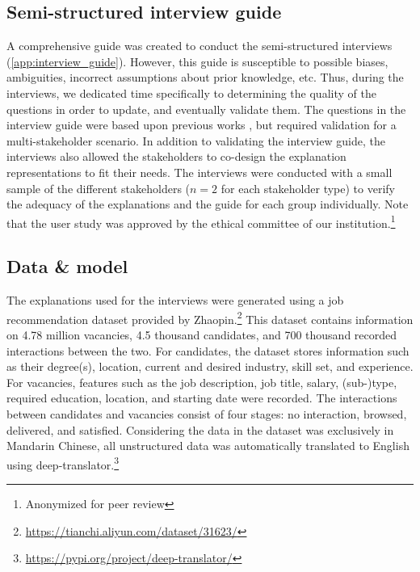 \subsection{Semi-structured interview guide}
A comprehensive guide was created to conduct the semi-structured interviews (\cref{app:interview_guide}). However, this guide is susceptible to possible biases, ambiguities, incorrect assumptions about prior knowledge, etc. Thus, during the interviews, we dedicated time specifically to determining the quality of the questions in order to update, and eventually validate them. The questions in the interview guide were based upon previous works \cite{chen2005trust,cramer2008effects,kleinerman2018providing,pu2011user}, but required validation for a multi-stakeholder scenario. In addition to validating the interview guide, the interviews also allowed the stakeholders to co-design the explanation representations to fit their needs. The interviews were conducted with a small sample of the different stakeholders ($n = 2$ for each stakeholder type) to verify the adequacy of the explanations and the guide for each group individually. Note that the user study was approved by the ethical committee of our institution.\footnote{Anonymized for peer review}


\subsection{Data \& model}
The explanations used for the interviews were generated using a job recommendation dataset provided by Zhaopin.\footnote{\url{https://tianchi.aliyun.com/dataset/31623/}} This dataset contains information on 4.78 million vacancies, 4.5 thousand candidates, and 700 thousand recorded interactions between the two. For candidates, the dataset stores information such as their degree(s), location, current and desired industry, skill set, and experience. For vacancies, features such as the job description, job title, salary, (sub-)type, required education, location, and starting date were recorded. The interactions between candidates and vacancies consist of four stages: no interaction, browsed, delivered, and satisfied. Considering the data in the dataset was exclusively in Mandarin Chinese, all unstructured data was automatically translated to English using deep-translator.\footnote{\url{https://pypi.org/project/deep-translator/}}


